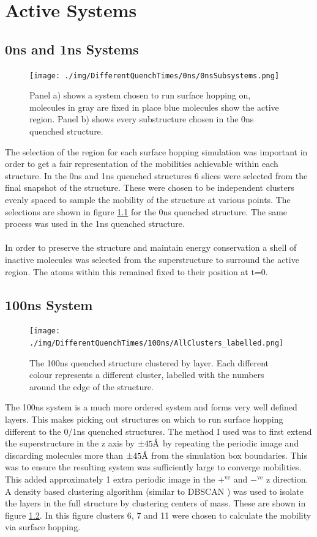 \chapter{Active Systems}
\label{ap:system_divisions}

\section{0ns and 1ns Systems}
\begin{figure}[ht]
	\texttt{[image: ./img/DifferentQuenchTimes/0ns/0nsSubsystems.png]}
	\caption{\label{fig:0nsSubSys}Panel a) shows a system chosen to run surface hopping on, molecules in gray are fixed in place blue molecules show the active region. Panel b) shows every substructure chosen in the 0ns quenched structure.}
\end{figure}
The selection of the region for each surface hopping simulation was important in order to get a fair representation of the mobilities achievable within each structure. In the 0ns and 1ns quenched structures 6 slices were selected from the final snapshot of the structure. These were chosen to be independent clusters evenly spaced to sample the mobility of the structure at various points. The selections are shown in figure \ref{fig:0nsSubSys} for the 0ns quenched structure. The same process was used in the 1ns quenched structure.
\\\\
In order to preserve the structure and maintain energy conservation a shell of inactive molecules was selected from the superstructure to surround the active region. The atoms within this remained fixed to their position at t=0.
\section{100ns System}
\begin{figure}[ht]
	\centering
	\texttt{[image: ./img/DifferentQuenchTimes/100ns/AllClusters\_labelled.png]}
	\caption{\label{fig:100nsClusteredLabelled}The 100ns quenched structure clustered by layer. Each different colour represents a different cluster, labelled with the numbers around the edge of the structure.}
\end{figure}
The 100ns system is a much more ordered system and forms very well defined layers. This makes picking out structures on which to run surface hopping different to the 0/1ns quenched structures. The method I used was to first extend the superstructure in the z axis by $\pm45 \text{\normalfont\AA}$ by repeating the periodic image and discarding molecules more than $\pm45 \text{\normalfont\AA}$ from the simulation box boundaries. This was to ensure the resulting system was sufficiently large to converge mobilities. This added approximately 1 extra periodic image in the $+^{\text{ve}}$ and $-^{\text{ve}}$ z direction. A density based clustering algorithm (similar to DBSCAN \cite{DBSCAN}) was used to isolate the layers in the full structure by clustering centers of mass. These are shown in figure \ref{fig:100nsClusteredLabelled}. In this figure clusters 6, 7 and 11 were chosen to calculate the mobility via surface hopping.

